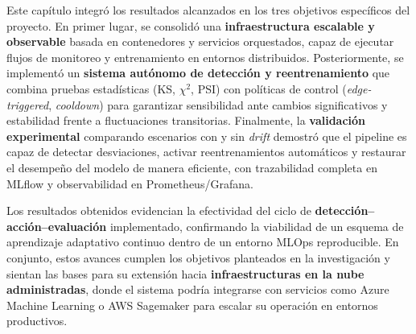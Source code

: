 Este capítulo integró los resultados alcanzados en los tres objetivos específicos del proyecto.  
En primer lugar, se consolidó una \textbf{infraestructura escalable y observable} basada en contenedores y servicios orquestados, capaz de ejecutar flujos de monitoreo y entrenamiento en entornos distribuidos.  
Posteriormente, se implementó un \textbf{sistema autónomo de detección y reentrenamiento} que combina pruebas estadísticas (KS, $\chi^2$, PSI) con políticas de control (\textit{edge-triggered}, \textit{cooldown}) para garantizar sensibilidad ante cambios significativos y estabilidad frente a fluctuaciones transitorias.  
Finalmente, la \textbf{validación experimental} comparando escenarios con y sin \textit{drift} demostró que el pipeline es capaz de detectar desviaciones, activar reentrenamientos automáticos y restaurar el desempeño del modelo de manera eficiente, con trazabilidad completa en MLflow y observabilidad en Prometheus/Grafana.

Los resultados obtenidos evidencian la efectividad del ciclo de \textbf{detección–acción–evaluación} implementado, confirmando la viabilidad de un esquema de aprendizaje adaptativo continuo dentro de un entorno MLOps reproducible.  
En conjunto, estos avances cumplen los objetivos planteados en la investigación y sientan las bases para su extensión hacia \textbf{infraestructuras en la nube administradas}, donde el sistema podría integrarse con servicios como Azure Machine Learning o AWS Sagemaker para escalar su operación en entornos productivos.
